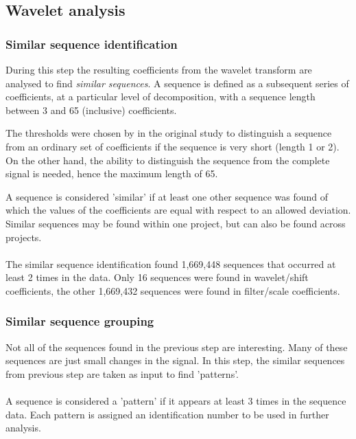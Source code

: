 \subsection{Wavelet analysis}
\subsubsection{Similar sequence identification}
During this step the resulting coefficients from the wavelet transform are
analysed to find \emph{similar sequences}\rm. A sequence is defined as a
subsequent series of coefficients, at a particular level of decomposition, with
a sequence length between 3 and 65 (inclusive) coefficients.

The thresholds were chosen by \citet{karus2013} in the original study to
distinguish a sequence from an ordinary set of coefficients if the sequence is
very short (length 1 or 2). On the other hand, the ability to distinguish the
sequence from the complete signal is needed, hence the maximum length of 65.

A sequence is considered 'similar' if at least one other sequence was found of
which the values of the coefficients are equal with respect to an allowed
deviation. Similar sequences may be found within one project, but can also be
found across projects.

\paragraph{}
The similar sequence identification found 1,669,448 sequences that occurred
at least 2 times in the data. Only 16 sequences were found in wavelet/shift
coefficients, the other 1,669,432 sequences were found in filter/scale
coefficients.

\subsubsection{Similar sequence grouping}
\label{def:pattern}
Not all of the sequences found in the previous step are interesting. Many of
these sequences are just small changes in the signal. In this step, the similar
sequences from previous step are taken as input to find 'patterns'.

\paragraph{}
A sequence is considered a 'pattern' if it appears at least 3 times in the
sequence data. Each pattern is assigned an identification number to be used in
further analysis.

